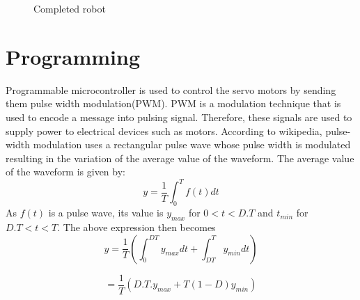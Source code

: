 \documentclass[letterpaper,12pt]{article}
\begin{document}
\begin{multicols}{2}
\begin{figure}[H]
\begin{center}
\end{center}
\caption{Completed robot}
\end{figure}


\section{Programming}
Programmable microcontroller is used to control the servo motors by sending them pulse width modulation(PWM). PWM is a modulation technique that is used to encode a message into pulsing signal. Therefore, these signals are used to supply power to electrical devices such as motors. According to wikipedia, pulse-width modulation uses a rectangular pulse wave whose pulse width is modulated resulting in the variation of the average value of the waveform. The average value of the waveform is given by:
\begin{equation}
y = \frac{1}{T}\int_{0}^{T}f(t) dt
\end{equation}
As $f(t)$ is a pulse wave, its value is $y_{max}$ for $0 < t < D.T$ and $t_{min}$ for $D.T < t < T.$ The above expression then becomes
\begin{equation}
y = \frac{1}{T}\left(\int_{0}^{DT}y_{max}dt + \int_{DT}^{T}y_{min}dt\right)
\end{equation}

\begin{equation}
= \frac{1}{T}\left(D.T.y_{max} + T(1-D)y_{min}\right)
\end{equation}


\end{multicols}
\end{document}
